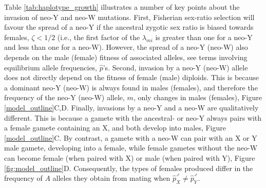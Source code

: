 \documentclass[12pt]{article}
\begin{document}
Table \ref{tab:haplotype_growth} illustrates a number of key points about the invasion of neo-Y and neo-W mutations. 
First, Fisherian sex-ratio selection will favour the spread of a neo-Y if the ancestral zygotic sex ratio is biased towards females, $\zeta<1/2$ (i.e., the first factor of the $\lambda_{mi}$ is greater than one for a neo-Y and less than one for a neo-W).
However, the spread of a neo-Y (neo-W) also depends on the male (female) fitness of associated alleles, see terms involving equilibrium allele frequencies, $\hat{p}$'s. %
Second, invasion by a neo-Y (neo-W) allele does not directly depend on the fitness of female (male) diploids. %
This is because a dominant neo-Y (neo-W) is always found in males (females), and therefore the frequency of the neo-Y (neo-W) allele, $m$, only changes in males (females), Figure \ref{model_outline}C,D. 
Finally, invasions by a neo-Y and a neo-W are qualitatively different.
This is because a gamete with the ancestral- or neo-Y always pairs with a female gamete containing an X, and both develop into males, Figure \ref{model_outline}C.
By contrast, a gamete with a neo-W can pair with an X or Y male gamete, developing into a female, while female gametes without the neo-W can become female (when paired with X) or male (when paired with Y), Figure \ref{fig:model_outline}D.
Consequently, the types of females produced differ in the frequency of $A$ alleles they obtain from mating when $\hat{p}_X^\male \neq \hat{p}_Y^\male$.
\end{document}
